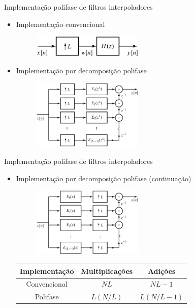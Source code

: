 \documentclass[
size=11pt,
paper=screen,
mode=present,
display=slidesnotes,
style=paintings,
nopagebreaks,
blackslide,
fleqn]{powerdot}
\begin{document}
\begin{slide}{Implementação polifase de filtros interpoladores}
	\begin{itemize}
		\item Implementação convencional
			\begin{figure}
				\centering
				\includegraphics[width=0.5\textwidth]{figs/4-41.eps}
			\end{figure}
		\item Implementação por decomposição polifase
			\begin{figure}
				\centering
				\includegraphics[width=0.5\textwidth]{figs/4-42.eps}
			\end{figure}
	\end{itemize}
\end{slide}

\begin{slide}{Implementação polifase de filtros interpoladores}
	\begin{itemize}
		\item Implementação por decomposição polifase (continuação)
			\begin{figure}
				\centering
				\includegraphics[width=0.5\textwidth]{figs/4-43.eps}
			\end{figure}
			\begin{table}
				\begin{tabular}[h]{c|c|c}
					\hline
					Implementação & Multiplicações & Adições\\
				        \hline	
					Convencional &   $NL$ & $NL-1$ \\
					Polifase     & $L(N/L)$ & $L(N/L -1 )$\\
					\hline
				\end{tabular}
			\end{table}
	\end{itemize}
\end{slide}
\end{document}
